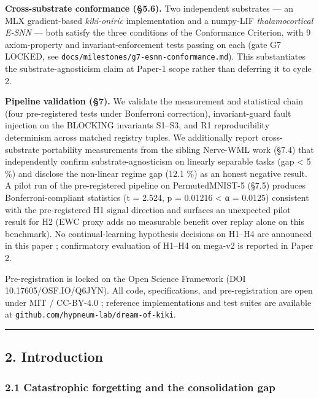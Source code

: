 \documentclass[
]{article}
\begin{document}
\textbf{Cross-substrate conformance (§5.6).} Two independent substrates
--- an MLX gradient-based \emph{kiki-oniric} implementation and a
numpy-LIF \emph{thalamocortical E-SNN} --- both satisfy the three
conditions of the Conformance Criterion, with 9 axiom-property and
invariant-enforcement tests passing on each (gate G7 LOCKED, see
\texttt{docs/milestones/g7-esnn-conformance.md}). This substantiates the
substrate-agnosticism claim at Paper-1 scope rather than deferring it to
cycle 2.

\textbf{Pipeline validation (§7).} We validate the measurement and
statistical chain (four pre-registered tests under Bonferroni
correction), invariant-guard fault injection on the BLOCKING invariants
S1--S3, and R1 reproducibility determinism across matched registry
tuples. We additionally report cross-substrate portability measurements
from the sibling Nerve-WML work (§7.4) that independently confirm
substrate-agnosticism on linearly separable tasks (gap \textless{} 5 \%)
and disclose the non-linear regime gap (12.1 \%) as an honest negative
result. A pilot run of the pre-registered pipeline on PermutedMNIST-5
(§7.5) produces Bonferroni-compliant statistics (t = 2.524, p = 0.01216
\textless{} α = 0.0125) consistent with the pre-registered H1 signal
direction and surfaces an unexpected pilot result for H2 (EWC proxy adds
no measurable benefit over replay alone on this benchmark). No
continual-learning hypothesis decisions on H1--H4 are announced in this
paper ; confirmatory evaluation of H1--H4 on mega-v2 is reported in
Paper 2.

Pre-registration is locked on the Open Science Framework (DOI
10.17605/OSF.IO/Q6JYN). All code, specifications, and pre-registration
are open under MIT / CC-BY-4.0 ; reference implementations and test
suites are available at \texttt{github.com/hypneum-lab/dream-of-kiki}.

\begin{center}\rule{0.5\linewidth}{0.5pt}\end{center}

\subsection{2. Introduction}\label{introduction}

\subsubsection{2.1 Catastrophic forgetting and the consolidation
gap}\label{catastrophic-forgetting-and-the-consolidation-gap}
\end{document}
